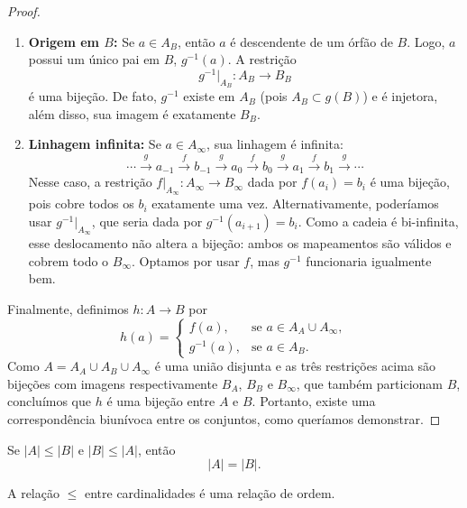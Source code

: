 \begin{proof}
\begin{enumerate}
        \item \textbf{Origem em \(B\):} Se \(a \in A_B\), então \(a\) é descendente de um órfão de \(B\). Logo, \(a\) possui um único pai em \(B\), \(g^{-1}(a)\). A restrição
              \[
                  g^{-1}|_{A_B}: A_B \to B_B
              \]
              é uma bijeção. De fato, \(g^{-1}\) existe em \(A_B\) (pois \(A_B \subset g(B)\)) e é injetora, além disso, sua imagem é exatamente \(B_B\).

        \item \textbf{Linhagem infinita:} Se \(a \in A_\infty\), sua linhagem é infinita:
              \[
                  \cdots \xrightarrow{g} a_{-1} \xrightarrow{f} b_{-1} \xrightarrow{g} a_0 \xrightarrow{f} b_0 \xrightarrow{g} a_1 \xrightarrow{f} b_1 \xrightarrow{g} \cdots
              \]
              Nesse caso, a restrição \(f|_{A_\infty}: A_\infty \to B_\infty\) dada por \(f(a_i) = b_i\) é uma bijeção, pois cobre todos os \(b_i\) exatamente uma vez.
              Alternativamente, poderíamos usar \(g^{-1}|_{A_\infty}\), que seria dada por \(g^{-1}(a_{i+1}) = b_i\). Como a cadeia é bi-infinita, esse deslocamento não altera a bijeção: ambos os mapeamentos são válidos e cobrem todo o \(B_\infty\). Optamos por usar \(f\), mas \(g^{-1}\) funcionaria igualmente bem.
    \end{enumerate}

    Finalmente, definimos \(h: A \to B\) por
    \[
        h(a) =
        \begin{cases}
            f(a),      & \text{se } a \in A_A \cup A_\infty, \\[4pt]
            g^{-1}(a), & \text{se } a \in A_B.
        \end{cases}
    \]
    Como \(A = A_A \cup A_B \cup A_\infty\) é uma união disjunta e as três restrições acima são bijeções com imagens respectivamente \(B_A\), \(B_B\) e \(B_\infty\), que também particionam \(B\), concluímos que \(h\) é uma bijeção entre \(A\) e \(B\). Portanto, existe uma correspondência biunívoca entre os conjuntos, como queríamos demonstrar.
\end{proof}

\begin{corolario}
    \label{cor:leq_cardinal_antissimetrico}
    Se \(|A|\leq |B|\) e \(|B|\leq |A|\), então
    \[
        |A|=|B|.
    \]
\end{corolario}

\begin{proposicao}
    \label{prop:leq_cardinal_ordem}
    A relação \(\leq\) entre cardinalidades é uma relação de ordem.
\end{proposicao}

